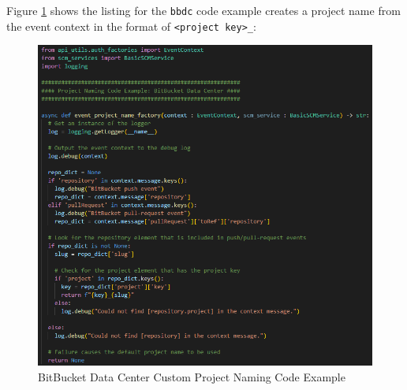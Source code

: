 Figure \ref{fig:naming-code-bbdc} shows the listing for the \texttt{bbdc} code example creates a project name from
the event context in the format of \texttt{<project key>\_<repository name>}:

\begin{figure}[h]
    \includegraphics[width=\textwidth]{graphics/naming-code-bbdc.png}
    \caption{BitBucket Data Center Custom Project Naming Code Example}
    \label{fig:naming-code-bbdc}
\end{figure}
